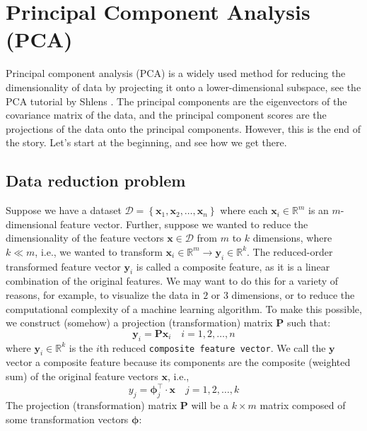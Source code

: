\documentclass{article}[11pt]
\def\R{\mathbb{R}}
\def\D{\mathcal{D}}
\begin{document}
\section{Principal Component Analysis (PCA)}
Principal component analysis (PCA) is a widely used method for reducing the dimensionality of data by projecting it onto a lower-dimensional subspace, see the PCA tutorial by Shlens \citep{Shlens:2014}. The principal components are the eigenvectors of the covariance matrix of the data, and the principal component scores are the projections of the data onto the principal components. However, this is the end of the story. Let's start at the beginning, and see how we get there.

\subsection{Data reduction problem}
Suppose we have a dataset $\D = \left\{\mathbf{x}_{1},\mathbf{x}_{2},\dots,\mathbf{x}_{n}\right\}$ where each $\mathbf{x}_{i}\in\mathbb{R}^{m}$ is an $m$-dimensional feature vector. Further, suppose we wanted to reduce the dimensionality of the feature vectors $\mathbf{x}\in\D$ from $m$ to $k$ dimensions, where $k\ll{m}$, i.e., we wanted to transform $\mathbf{x}_{i}\in\R^{m}\rightarrow\mathbf{y}_{i}\in\R^{k}$. The reduced-order transformed feature vector $\mathbf{y}_{i}$ is called a composite feature, as it is a linear combination of the original features. We may want to do this for a variety of reasons, for example, to visualize the data in $2$ or $3$ dimensions, or to reduce the computational complexity of a machine learning algorithm. To make this possible, we construct (somehow) a projection (transformation) matrix $\mathbf{P}$ such that:
\begin{equation}
   \mathbf{y}_{i} = \mathbf{P}\mathbf{x}_{i}\quad{i=1,2,\dots,n}
\end{equation}
where $\mathbf{y}_{i}\in\R^{k}$ is the $i$th reduced \texttt{composite feature vector}. 
We call the $\mathbf{y}$ vector a composite feature because its components are the composite (weighted sum) of the original feature vectors $\mathbf{x}$, i.e., 
\begin{equation}
y_{j} = {\mathbf{\phi}}_{j}^{\top}\cdot\mathbf{x}\quad{j=1,2,\dots,k}
\end{equation}
The projection (transformation) matrix $\mathbf{P}$ will be a $k\times{m}$ matrix composed of some transformation vectors $\mathbf{\phi}$:
\end{document}
